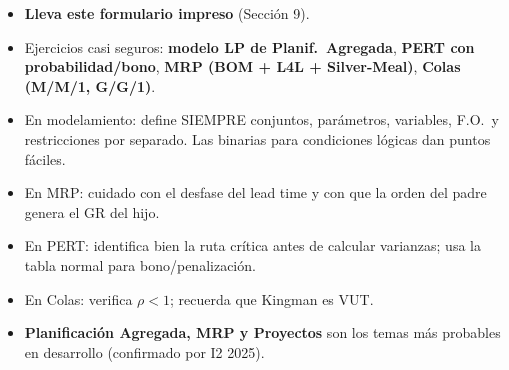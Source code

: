 \begin{paradesarrollo}
\begin{itemize}[leftmargin=1.2em, itemsep=1pt]
  \item \textbf{Lleva este formulario impreso} (Sección 9).
  \item Ejercicios casi seguros: \textbf{modelo LP de Planif.\ Agregada}, \textbf{PERT con probabilidad/bono}, \textbf{MRP (BOM + L4L + Silver-Meal)}, \textbf{Colas (M/M/1, G/G/1)}.
  \item En modelamiento: define SIEMPRE conjuntos, parámetros, variables, F.O.\ y restricciones por separado. Las binarias para condiciones lógicas dan puntos fáciles.
  \item En MRP: cuidado con el desfase del lead time y con que la orden del padre genera el GR del hijo.
  \item En PERT: identifica bien la ruta crítica antes de calcular varianzas; usa la tabla normal para bono/penalización.
  \item En Colas: verifica $\rho<1$; recuerda que Kingman es VUT.
  \item \textbf{Planificación Agregada, MRP y Proyectos} son los temas más probables en desarrollo (confirmado por I2 2025).
\end{itemize}
\end{paradesarrollo}

